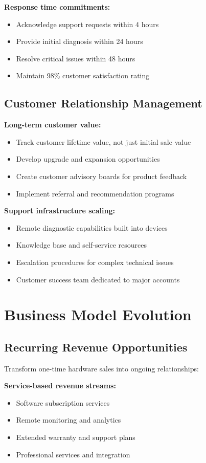\textbf{Response time commitments:}
\begin{itemize}
\item Acknowledge support requests within 4 hours
\item Provide initial diagnosis within 24 hours
\item Resolve critical issues within 48 hours
\item Maintain 98\% customer satisfaction rating
\end{itemize}

\subsection{Customer Relationship Management}

\textbf{Long-term customer value:}
\begin{itemize}
\item Track customer lifetime value, not just initial sale value
\item Develop upgrade and expansion opportunities
\item Create customer advisory boards for product feedback
\item Implement referral and recommendation programs
\end{itemize}

\textbf{Support infrastructure scaling:}
\begin{itemize}
\item Remote diagnostic capabilities built into devices
\item Knowledge base and self-service resources
\item Escalation procedures for complex technical issues
\item Customer success team dedicated to major accounts
\end{itemize}

\section{Business Model Evolution}

\subsection{Recurring Revenue Opportunities}

Transform one-time hardware sales into ongoing relationships:

\textbf{Service-based revenue streams:}
\begin{itemize}
\item Software subscription services
\item Remote monitoring and analytics
\item Extended warranty and support plans
\item Professional services and integration
\end{itemize}

